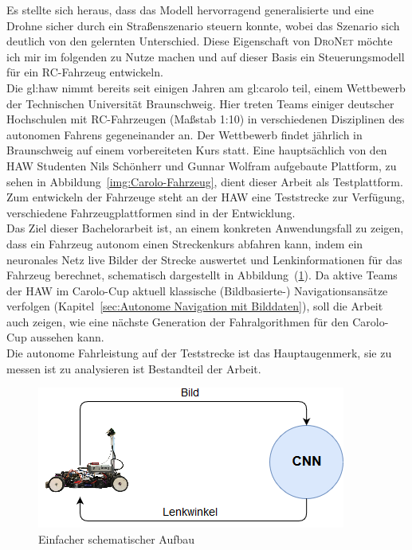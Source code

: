 Es stellte sich heraus, dass das Modell hervorragend generalisierte und eine Drohne sicher durch ein Straßenszenario steuern konnte, wobei das Szenario sich deutlich von den gelernten Unterschied. Diese Eigenschaft von \textsc{DroNet} möchte ich mir im folgenden zu Nutze machen und auf dieser Basis ein Steuerungsmodell für ein RC-Fahrzeug entwickeln.\\

Die \gls{gl:haw} nimmt bereits seit einigen Jahren am \glqq \gls{gl:carolo} \grqq{} teil, einem Wettbewerb der Technischen Universität Braunschweig. Hier treten Teams einiger deutscher Hochschulen mit RC-Fahrzeugen (Maßstab 1:10) in verschiedenen Disziplinen des autonomen Fahrens gegeneinander an. Der Wettbewerb findet jährlich in Braunschweig auf einem vorbereiteten Kurs statt.
Eine hauptsächlich von den HAW Studenten Nils Schönherr und Gunnar Wolfram aufgebaute Plattform, zu sehen in Abbildung~\ref{img:Carolo-Fahrzeug}, dient dieser Arbeit als Testplattform.
Zum entwickeln der Fahrzeuge steht an der HAW eine Teststrecke zur Verfügung, verschiedene Fahrzeugplattformen sind in der Entwicklung.\\
Das Ziel dieser Bachelorarbeit ist, an einem konkreten Anwendungsfall zu zeigen, dass ein Fahrzeug autonom einen Streckenkurs abfahren kann, indem ein neuronales Netz live Bilder der Strecke auswertet und Lenkinformationen für das Fahrzeug berechnet, schematisch dargestellt in Abbildung~(\ref{img:Aufbau}). Da aktive Teams der HAW im Carolo-Cup aktuell klassische (Bildbasierte-) Navigationsansätze verfolgen (Kapitel~\ref{sec:Autonome Navigation mit Bilddaten}), soll die Arbeit auch zeigen, wie eine nächste Generation der Fahralgorithmen für den Carolo-Cup aussehen kann.\\

Die autonome Fahrleistung auf der Teststrecke ist das Hauptaugenmerk, sie zu messen ist zu analysieren ist Bestandteil der Arbeit.

\begin{figure}[h]
	\centering
	\includegraphics[scale=0.7]{figures/Aufbau.png}
	\caption{Einfacher schematischer Aufbau }
	\label{img:Aufbau}
\end{figure}


